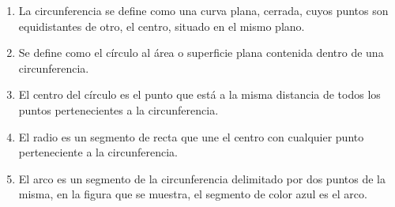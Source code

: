 \documentclass[14pt]{extarticle}
\begin{document}
\begin{enumerate}
\item La circunferencia se define como una curva plana, cerrada, cuyos puntos son equidistantes de otro, el centro, situado en el mismo plano.
\begin{figure}[H]
    \centering
\end{figure}
\item Se define como el círculo al área o superficie plana contenida dentro de una circunferencia.
\begin{figure}[H]
    \centering
\end{figure}
\item El centro del círculo es el punto que está a la misma distancia de todos los puntos pertenecientes a la circunferencia.
\begin{figure}[H]
    \centering
\end{figure}
\item El radio es un segmento de recta que une el centro con cualquier punto perteneciente a la circunferencia.
\begin{figure}[H]
    \centering
\end{figure}
\item El arco es un segmento de la circunferencia delimitado por dos puntos de la misma, en la figura que se muestra, el segmento de color azul es el arco.

\end{enumerate}
\end{document}
